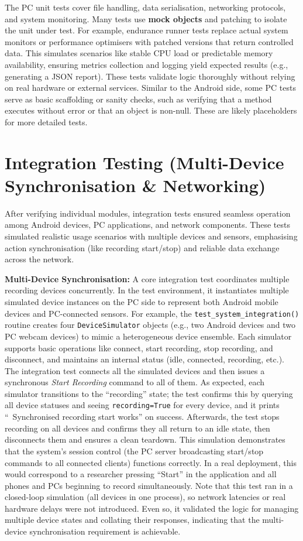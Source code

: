 The PC unit tests cover file handling, data serialisation, networking protocols, and system monitoring. Many tests use \textbf{mock objects} and patching to isolate the unit under test. For example, endurance runner tests replace actual system monitors or performance optimisers with patched versions that return controlled data. This simulates scenarios like stable CPU load or predictable memory availability, ensuring metrics collection and logging yield expected results (e.g., generating a JSON report). These tests validate logic thoroughly without relying on real hardware or external services. Similar to the Android side, some PC tests serve as basic scaffolding or sanity checks, such as verifying that a method executes without error or that an object is non-null. These are likely placeholders for more detailed tests.


\section{Integration Testing (Multi-Device Synchronisation \& Networking)}
After verifying individual modules, integration tests ensured seamless operation among Android devices, PC applications, and network components. These tests simulated realistic usage scenarios with multiple devices and sensors, emphasising action synchronisation (like recording start/stop) and reliable data exchange across the network.

\textbf{Multi-Device Synchronisation:} A core integration test coordinates multiple recording devices concurrently. In the test environment, it instantiates multiple simulated device instances on the PC side to represent both Android mobile devices and PC-connected sensors. For example, the \texttt{test\_system\_integration()} routine creates four \texttt{DeviceSimulator} objects (e.g., two Android devices and two PC webcam devices) to mimic a heterogeneous device ensemble. Each simulator supports basic operations like connect, start recording, stop recording, and disconnect, and maintains an internal status (idle, connected, recording, etc.). The integration test connects all the simulated devices and then issues a synchronous \emph{Start Recording} command to all of them. As expected, each simulator transitions to the ``recording'' state; the test confirms this by querying all device statuses and seeing \texttt{recording=True} for every device, and it prints ``\checkmark\ Synchronised recording start works'' on success. Afterwards, the test stops recording on all devices and confirms they all return to an idle state, then disconnects them and ensures a clean teardown. This simulation demonstrates that the system's session control (the PC server broadcasting start/stop commands to all connected clients) functions correctly. In a real deployment, this would correspond to a researcher pressing ``Start'' in the application and all phones and PCs beginning to record simultaneously. Note that this test ran in a closed-loop simulation (all devices in one process), so network latencies or real hardware delays were not introduced. Even so, it validated the logic for managing multiple device states and collating their responses, indicating that the multi-device synchronisation requirement is achievable.

